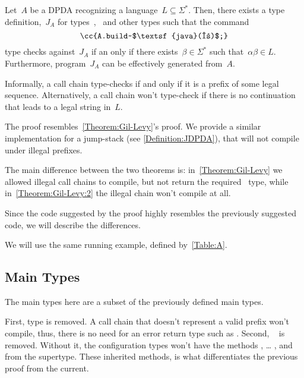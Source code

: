 \begin{theorem}\label{Theorem:Gil-Levy:2}
  Let~$A$ be a DPDA recognizing a language~$L⊆Σ^*$.
  Then, there exists a \Java type definition,~$J_A$ for types~,~ and
    other types such that the \Java command
  \begin{equation}
    \label{Equation:prefix:result}
    \cc{A.build~$\textsf{java}(α)$;}
  \end{equation}
  type checks against~$J_A$ if an only if there exists~$β∈Σ^*$ such
  that~$αβ∈L$.
  Furthermore, program~$J_A$ can be effectively generated from~$A$.
\end{theorem}

Informally, a call chain type-checks if and only if it is a prefix
  of some legal sequence.
Alternatively, a call chain won't type-check if there is no
  continuation that leads to a legal string in~$L$.

The proof resembles~\cref{Theorem:Gil-Levy}'s proof.
We provide a similar implementation for a jump-stack (see \cref{Definition:JDPDA}),
  that will not compile under illegal prefixes.

The main difference between the two theorems is:
  in~\cref{Theorem:Gil-Levy} we allowed illegal call chains to compile,
  but not return the required~ type, while in~\cref{Theorem:Gil-Levy:2}
  the illegal chain won't compile at all.

Since the code suggested by the proof highly resembles the previously
  suggested code, we will describe the differences.

We will use the same running example, defined by~\cref{Table:A}.

\subsection{Main Types}
The main types here are a subset of the previously defined main types.

\begin{quote}
\end{quote}

First, type  is removed.
A call chain that doesn't represent a valid prefix won't compile,
  thus, there is no need for an error return type such as .
Second, ~ is removed.
Without it, the configuration types won't have the
  methods , … , and \cc{\$()} from the supertype.
These inherited methods, is what differentiates the previous proof from the current.

